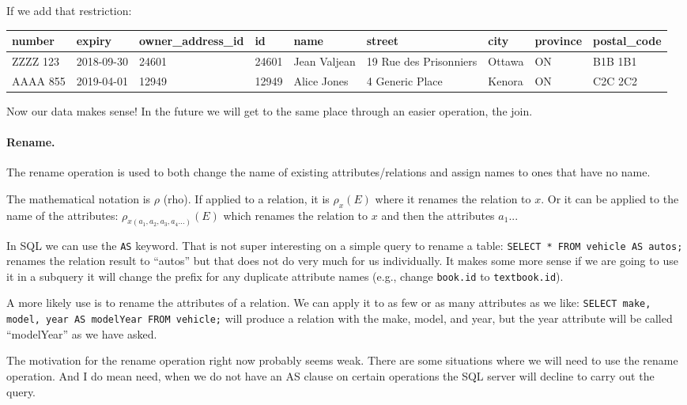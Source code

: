 If we add that restriction:

{\scriptsize
\begin{center}
	\begin{tabular}{|l|l|l|l|l|l|l|l|l|}\hline
		\textbf{number} & \textbf{expiry} & \textbf{owner\_address\_id} & \textbf{id} & \textbf{name} &\textbf{street} & \textbf{city} & \textbf{province} & \textbf{postal\_code} \\ \hline
		ZZZZ 123 & 2018-09-30 & 24601 & 24601 & Jean Valjean & 19 Rue des Prisonniers & Ottawa & ON & B1B 1B1\\ \hline
		AAAA 855 & 2019-04-01 & 12949 & 12949 & Alice Jones & 4 Generic Place & Kenora & ON & C2C 2C2\\ \hline
	\end{tabular}
\end{center}
}

Now our data makes sense! In the future we will get to the same place through an easier operation, the join.

\paragraph{Rename.} The rename operation is used to both change the name of existing attributes/relations and assign names to ones that have no name. 

The mathematical notation is $\rho$ (rho). If applied to a relation, it is $\rho_{x}(E)$ where it renames the relation to $x$. Or it can be applied to the name of the attributes: $\rho_{x(a_{1}, a_{2}, a_{3}, a_{4}...)}(E)$ which renames the relation to $x$ and then the attributes $a_{1}$...

In SQL we can use the \texttt{AS} keyword. That is not super interesting on a simple query to rename a table: \texttt{SELECT * FROM vehicle AS autos;} renames the relation result to ``autos'' but that does not do very much for us individually. It makes some more sense if we are going to use it in a subquery it will change the prefix for any duplicate attribute names (e.g., change \texttt{book.id} to \texttt{textbook.id}). 

A more likely use is to rename the attributes of a relation. We can apply it to as few or as many attributes as we like: \texttt{SELECT make, model, year AS modelYear FROM vehicle;} will produce a relation with the make, model, and year, but the year attribute will be called ``modelYear'' as we have asked.

The motivation for the rename operation right now probably seems weak. There are some situations where we will need to use the rename operation. And I do mean need, when we do not have an AS clause on certain operations the SQL server will decline to carry out the query.

